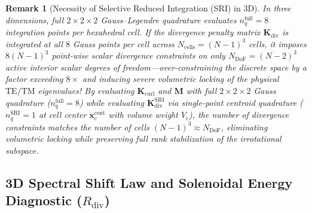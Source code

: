 \documentclass[preprint,12pt]{elsarticle}
\newtheorem{remark}{Remark}
\begin{document}
\begin{remark}[Necessity of Selective Reduced Integration (SRI) in 3D]
\label{rem:sri_3d}
In three dimensions, full $2\times 2\times 2$ Gauss--Legendre quadrature evaluates $n_q^{\text{full}} = 8$ integration points per hexahedral cell. If the divergence penalty matrix $\mathbf{K}_{\text{div}}$ is integrated at all $8$ Gauss points per cell across $N_{\text{cells}} = (N-1)^3$ cells, it imposes $8(N-1)^3$ point-wise scalar divergence constraints on only $N_{\text{DoF}} = (N-2)^3$ active interior scalar degrees of freedom---over-constraining the discrete space by a factor exceeding $8\times$ and inducing severe volumetric locking of the physical $\text{TE}/\text{TM}$ eigenvalues! By evaluating $\mathbf{K}_{\text{curl}}$ and $\mathbf{M}$ with full $2\times 2\times 2$ Gauss quadrature ($n_q^{\text{full}}=8$) while evaluating $\mathbf{K}_{\text{div}}^{\text{SRI}}$ via single-point centroid quadrature ($n_q^{\text{SRI}}=1$ at cell center $\mathbf{x}_c^{\text{cent}}$ with volume weight $V_c$), the number of divergence constraints matches the number of cells $(N-1)^3 \approx N_{\text{DoF}}$, eliminating volumetric locking while preserving full rank stabilization of the irrotational subspace.
\end{remark}

\subsection{3D Spectral Shift Law and Solenoidal Energy Diagnostic ($R_{\text{div}}$)}
\label{subsec:spectral_shift_law_3d}
\end{document}
